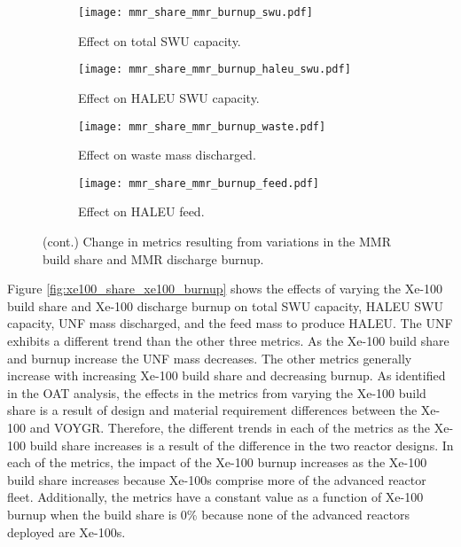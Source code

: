 \begin{figure}
    \ContinuedFloat    
    \begin{subfigure}[h!]{0.48\textwidth}
        \centering
        \texttt{[image: mmr\_share\_mmr\_burnup\_swu.pdf]}
        \caption{Effect on total SWU capacity.}
        \label{fig:mmr_share_mmr_burnup_swu}
    \end{subfigure}
    \hfill
    \begin{subfigure}[h!]{0.48\textwidth}
        \centering
        \texttt{[image: mmr\_share\_mmr\_burnup\_haleu\_swu.pdf]}
        \caption{Effect on HALEU SWU capacity.}
        \label{fig:mmr_share_mmr_burnup_haleu_swu}
    \end{subfigure}
    
    \begin{subfigure}[h!]{0.48\textwidth}
        \centering
        \texttt{[image: mmr\_share\_mmr\_burnup\_waste.pdf]}
        \caption{Effect on waste mass discharged.}
        \label{fig:mmr_share_mmr_burnup_waste}
    \end{subfigure}
    \hfill
    \begin{subfigure}[h!]{0.48\textwidth}
        \centering
        \texttt{[image: mmr\_share\_mmr\_burnup\_feed.pdf]}
        \caption{Effect on HALEU feed.}
        \label{fig:mmr_share_mmr_burnup_feed}
    \end{subfigure}
    \caption{(cont.) Change in metrics resulting from variations in the 
    MMR build share and MMR discharge burnup.}
    \label{fig:mmr_share_mmr_burnup}
\end{figure}

Figure \ref{fig:xe100_share_xe100_burnup} shows the effects of varying 
the Xe-100 build share and Xe-100 discharge burnup on total \gls{SWU}
capacity, \gls{HALEU} \gls{SWU} capacity, \gls{UNF} mass discharged, and
the feed mass to produce \gls{HALEU}. The \gls{UNF} exhibits a different 
trend than the other three metrics. As the Xe-100 build share and 
burnup increase the \gls{UNF} mass decreases. The other metrics generally
increase with increasing Xe-100 build share and decreasing burnup. 
As identified in the \gls{OAT} analysis, the effects in the metrics from 
varying the Xe-100 build share is a result of design and material 
requirement differences between the Xe-100 and VOYGR. Therefore, the 
different trends in each of the metrics as the Xe-100 build share increases 
is a result of the difference in the two reactor designs. 
In each of 
the metrics, the impact of the Xe-100 burnup increases as the 
Xe-100 build share increases because Xe-100s comprise more of 
the advanced reactor fleet. Additionally, the metrics have a constant value 
as a function of Xe-100 burnup when the build share is 0\% because none 
of the advanced reactors deployed are Xe-100s. 

